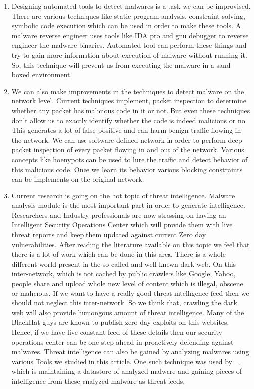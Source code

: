 \documentclass[11pt]{article}
\begin{document}
	\begin{enumerate}
		\item Designing automated tools to detect malwares is a task we can be improvised. There are various techniques like static program analysis, constraint solving, symbolic code execution which can be used in order to make these tools. A malware reverse engineer uses tools like IDA pro and gnu debugger to reverse engineer the malware binaries. Automated tool can perform these things and try to gain more information about execution of malware without running it. So, this technique will prevent us from executing the malware in a sand-boxed environment.
		
		\item We can also make improvements in the techniques to detect malware on the network level. Current techniques implement, packet inspection to determine whether any packet has malicious code in it or not. But even these techniques don't allow us to exactly identify whether the code is indeed malicious or no. This generates a lot of false positive and can harm benign traffic flowing in the network. We can use software defined network in order to perform deep packet inspection of every packet flowing in and out of the network. Various concepts like hoenypots can be used to lure the traffic and detect behavior of this malicious code. Once we learn its behavior various blocking constraints can be implements on the original network.
		
		\item Current research is going on the hot topic of threat intelligence. Malware analysis module is the most important part in order to generate intelligence. Researchers and Industry professionals are now stressing on having an Intelligent Security Operations Center which will provide them with live threat reports and keep them updated against current Zero day vulnerabilities. After reading the literature available on this topic we feel that there is a lot of work which can be done in this area. There is a whole different world present in the so called and well known dark web. On this inter-network, which is not cached by public crawlers like Google, Yahoo, people share and upload whole new level of content which is illegal, obscene or malicious. If we want to have a really good threat intelligence feed then we should not neglect this inter-network. So we think that, crawling the dark web will also provide humongous amount of threat intelligence. Many of the BlackHat guys are known to publish zero day exploits on this websites. Hence, if we have live constant feed of these details then our security operations center can be one step ahead in proactively defending against malwares. Threat intelligence can also be gained by analyzing malwares using various Tools we studied in this article. One such technique was used by ~\cite{moditowards}, which is maintaining a datastore of analyzed malware and gaining pieces of intelligence from these analyzed malware as threat feeds.
		

\end{enumerate}
\end{document}
